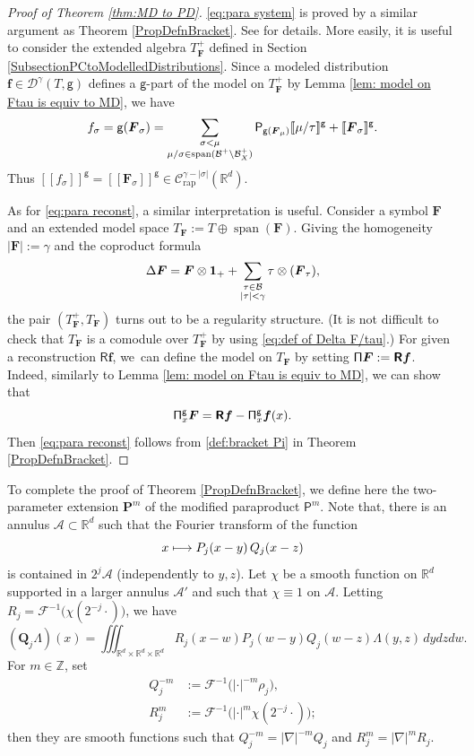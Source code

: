 \documentclass[11pt]{article}
\numberwithin{equation}{section}
\newcommand\mto{\mathchoice{\longmapsto}{\mapsto}{\mapsto}{\mapsto}}
\DeclareMathOperator{\Span}{span}
\theoremstyle{plain}
\theoremstyle{definition}
\newcommand{\Brac}[1]{[\![#1]\!]}
\newcommand{\bsf}{\boldsymbol{f}}
\newcommand{\rap}{\mathrm{rap}}
\newcommand{\bfP}{\mathbf{P}}
\newcommand{\bfQ}{\mathbf{Q}}
\newcommand{\reR}{\boldsymbol{\mathsf{R}}}
\newcommand{\sfP}{\mathsf{P}}
\newcommand{\sfg}{\mathsf{g}}
\newcommand{\bsF}{\boldsymbol{F}}
\newcommand{\bbR}{\mathbb{R}}
\newcommand{\bbZ}{\mathbb{Z}}
\newcommand{\mcA}{\mathcal{A}}
\newcommand{\mcB}{\mathcal{B}}
\newcommand{\mcC}{\mathcal{C}}
\newcommand{\mcD}{\mathcal{D}}
\newcommand{\mcF}{\mathcal{F}}
\begin{document}
\begin{proof}[Proof of Theorem \ref{thm:MD to PD}]
\eqref{eq:para system} is proved by a similar argument as Theorem \ref{PropDefnBracket}.
See \cite[Th.\,14]{BH} for details.
More easily, it is useful to consider the extended algebra $T_{\bsF}^+$ defined in Section \ref{SubsectionPCtoModelledDistributions}.
Since a modeled distribution $\bsf\in\mcD^\gamma(T,\sfg)$ defines a $\sfg$-part of the model on $T_{\bsF}^+$ by Lemma \ref{lem: model on Ftau is equiv to MD}, we have
\[
f_\sigma=\sfg(\bsF_\sigma)=\sum_{\substack{\sigma<\mu \\ \mu/\sigma\in\Span (\mcB^+\setminus\mcB_X^+)}}{\sf P}_{\sfg(\bsF_\mu)}\Brac{\mu/\tau}^{\sfg}+\Brac{\bsF_\sigma}^{\sfg}.
\]
Thus $\Brac{f_\sigma}^{\sfg}=\Brac{\bsF_\sigma}^{\sfg}\in\mcC_{\rap}^{\gamma-|\sigma|}(\bbR^d)$.

As for \eqref{eq:para reconst}, a similar interpretation is useful. Consider a symbol $\bsF$ and an extended model space $T_{\bsF}:=T\oplus\Span (\bsF)$. Giving the homogeneity $|\bsF|:=\gamma$ and the coproduct formula
\[
\Delta\bsF=\bsF\otimes{\bf1}_++\sum_{\substack{\tau\in\mcB\\|\tau|<\gamma}}\tau\otimes(\bsF_\tau),
\]
the pair $(T_{\bsF}^+,T_{\bsF})$ turns out to be a regularity structure. (It is not difficult to check that $T_{\bsF}$ is a comodule over $T_{\bsF}^+$ by using \eqref{eq:def of Delta F/tau}.)
For given a reconstruction $\reR\bsf$, we~can define the model on $T_{\bsF}$ by setting ${\sf\Pi}\bsF:=\reR\bsf$. Indeed, similarly to Lemma \ref{lem: model on Ftau is equiv to MD}, we can show that
\[
{\sf\Pi}_x^{\sfg}\bsF=\reR\bsf-{\sf\Pi}_x^{\sfg}\bsf(x).
\]
Then \eqref{eq:para reconst} follows from \eqref{def:bracket Pi} in Theorem \ref{PropDefnBracket}.
\end{proof}

To complete the proof of Theorem \ref{PropDefnBracket}, we define here the two-parameter extension $\bfP^m$ of the modified paraproduct $\sfP^m$. Note that, there is an annulus $\mcA\subset\bbR^d$ such that the Fourier transform of the function
\[
x\mto P_j(x-y)\,Q_j(x-z)
\]
is contained in $2^j\mcA$ (independently to $y,z$). Let $\chi$ be a smooth function on $\bbR^d$ supported in a larger annulus $\mcA'$ and such that $\chi\equiv1$ on $\mcA$. Letting $R_j=\mcF^{-1}\bigl(\chi(2^{-j}\cdot)\bigr)$, we have
\[
(\bfQ_j \Lambda)(x)=\iiint_{\bbR^d\times\bbR^d\times\bbR^d} R_j(x-w)P_j(w-y)Q_j(w-z) \Lambda(y,z)\,dydzdw.
\]
For $m\in\bbZ$, set
\begin{equation*} \begin{split}
Q_j^{-m} &:= \mcF^{-1}\bigl(|{\cdot}|^{-m}\rho_j\bigr), \\
R_j^m &:= \mcF^{-1}\bigl(|{\cdot}|^m\chi(2^{-j}\cdot)\bigr);
\end{split} \end{equation*}
then they are smooth functions such that $Q_j^{-m} = |\nabla|^{-m}Q_j$ and $R_j^m = |\nabla|^m R_j$.
\end{document}
